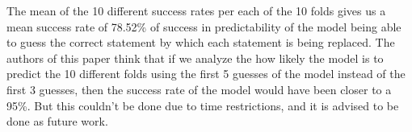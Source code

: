\begin{table*}
	\centering
\caption{10 Fold cross validation of the probabilistic model}
\label{tab:cross-validation}
\end{table*}

The mean of the 10 different success rates per each of the 10 folds gives us a mean success rate of 78.52\% of success in predictability of the model being able to guess the correct statement by which each statement is being replaced.  
The authors of this paper think that if we analyze the how likely the model is to predict the 10 different folds using the first 5 guesses of the model instead of the first 3 guesses, then the success rate of the model would have been closer to a 95\%. But this couldn't be done due to time restrictions, and it is advised to be done as future work.
